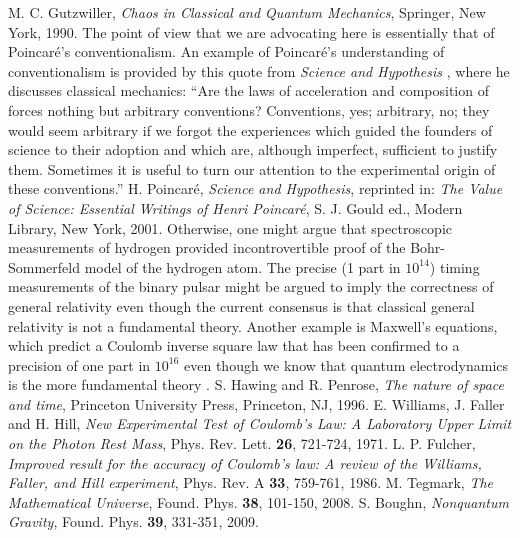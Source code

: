 \documentclass [12pt]{revtex4}
\begin{document}
\begin{thebibliography}{99}
 M. C. Gutzwiller, {\it Chaos in Classical and Quantum Mechanics}, Springer, New York, 1990.
 The point of view that we are advocating here is essentially that of Poincar\'{e}'s conventionalism. An example of Poincar\'{e}'s understanding of conventionalism is provided by this quote from {\it Science and Hypothesis} \cite{P1902}, where he discusses classical mechanics: ``Are the laws of acceleration and composition of forces nothing but arbitrary conventions? Conventions, yes; arbitrary, no; they would seem arbitrary if we forgot the experiences which guided the founders of science to their adoption and which are, although imperfect, sufficient to justify them. Sometimes it is useful to turn our attention to the experimental origin of these conventions.''
 H. Poincar\'{e}, {\it Science and Hypothesis}, reprinted in: {\it The Value of Science: Essential Writings of Henri Poincar\'{e}}, S. J. Gould ed., Modern Library, New York, 2001.
 Otherwise, one might argue that spectroscopic measurements of hydrogen provided incontrovertible proof of the Bohr-Sommerfeld model of the hydrogen atom.  The precise (1 part in $10^{14}$) timing measurements of the binary pulsar might be argued to imply the correctness of general relativity \cite{HP1996} even though the current consensus is that classical general relativity is not a fundamental theory.  Another example is Maxwell's equations, which predict a Coulomb inverse square law that has been confirmed to a precision of one part in $10^{16}$ even though we know that quantum electrodynamics is the more fundamental theory \cite{WFH1971,F1986}.
 S. Hawing and R. Penrose, {\it The nature of space and time}, Princeton University Press, Princeton, NJ, 1996.
 E. Williams, J. Faller and H. Hill, {\it New Experimental Test of Coulomb's Law: A Laboratory Upper Limit on the Photon Rest Mass}, Phys. Rev. Lett. \textbf{26}, 721-724, 1971.
 L. P. Fulcher, {\it Improved result for the accuracy of Coulomb's law: A review of the Williams, Faller, and Hill experiment}, Phys. Rev. A \textbf{33}, 759-761, 1986.
 M. Tegmark, {\it The Mathematical Universe}, Found. Phys. \textbf{38}, 101-150, 2008.
 S. Boughn, {\it Nonquantum Gravity}, Found. Phys. \textbf{39}, 331-351, 2009.

\end{thebibliography}
\end{document}
